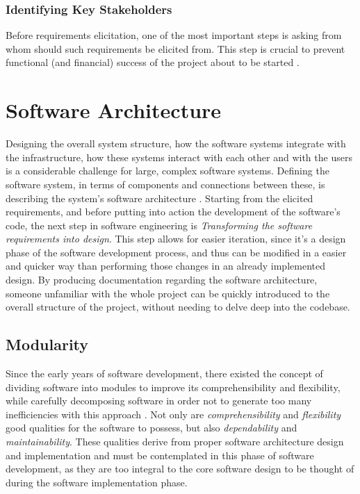 \subsubsection{Identifying Key Stakeholders}\label{state-of-the-art:sss:identifying-key-stakeholders}

Before requirements elicitation, one of the most important steps is asking from whom should such requirements be elicited from. This step is crucial to prevent functional (and financial) success of the project about to be started \parencite{lewellen_2020}.


\section{Software Architecture}\label{state-of-the-art:s:software-architecture}

Designing the overall system structure, how the software systems integrate with the infrastructure, how these systems interact with each other and with the users is a considerable challenge for large, complex software systems. Defining the software system, in terms of components and connections between these, is describing the system's software architecture \Parencite{hasselbring2018software}. Starting from the elicited requirements, and before putting into action the development of the software's code, the next step in software engineering is \textit{Transforming the software requirements into design}. This step allows for easier iteration, since it's a design phase of the software development process, and thus can be modified in a easier and quicker way than performing those changes in an already implemented design.
By producing documentation regarding the software architecture, someone unfamiliar with the whole project can be quickly introduced to the overall structure of the project, without needing to delve deep into the codebase.

\subsection{Modularity}\label{state-of-the-art:ss:modularity}

Since the early years of software development, there existed the concept of dividing software into modules to improve its comprehensibility and flexibility, while carefully decomposing software in order not to generate too many inefficiencies with this approach \Parencite{parnas_1972}. Not only are \textit{comprehensibility} and \textit{flexibility} good qualities for the software to possess, but also \textit{dependability} and \textit{maintainability}. These qualities derive from proper software architecture design and implementation and must be contemplated in this phase of software development, as they are too integral to the core software design to be thought of during the software implementation phase.

